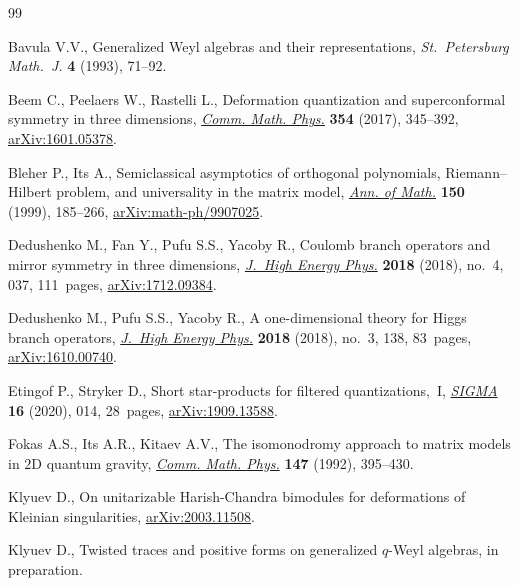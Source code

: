 \documentclass[10pt,a4paper]{amsart}
\theoremstyle{definition}
\numberwithin{equation}{section}
\begin{document}

\begin{thebibliography}{99}
\footnotesize\itemsep=0pt

Bavula V.V., Generalized {W}eyl algebras and their representations,
 \textit{St.~Petersburg Math.~J.} \textbf{4} (1993), 71--92.

Beem C., Peelaers W., Rastelli L., Deformation quantization and superconformal
 symmetry in three dimensions, \href{https://doi.org/10.1007/s00220-017-2845-6}{\textit{Comm. Math. Phys.}} \textbf{354} (2017),
 345--392, \href{https://arxiv.org/abs/1601.05378}{arXiv:1601.05378}.

Bleher P., Its A., Semiclassical asymptotics of orthogonal polynomials,
 {R}iemann--{H}ilbert problem, and universality in the matrix model,
 \href{https://doi.org/10.2307/121101}{\textit{Ann. of Math.}} \textbf{150} (1999), 185--266,
 \href{https://arxiv.org/abs/math-ph/9907025}{arXiv:math-ph/9907025}.

Dedushenko M., Fan Y., Pufu S.S., Yacoby R., Coulomb branch operators and
 mirror symmetry in three dimensions, \href{https://doi.org/10.1007/jhep04(2018)037}{\textit{J.~High Energy Phys.}}
 \textbf{2018} (2018), no.~4, 037, 111~pages, \href{https://arxiv.org/abs/1712.09384}{arXiv:1712.09384}.

Dedushenko M., Pufu S.S., Yacoby R., A one-dimensional theory for {H}iggs
 branch operators, \href{https://doi.org/10.1007/jhep03(2018)138}{\textit{J.~High Energy Phys.}} \textbf{2018} (2018), no.~3,
 138, 83~pages, \href{https://arxiv.org/abs/1610.00740}{arXiv:1610.00740}.

Etingof P., Stryker D., Short star-products for filtered quantizations,~{I},
 \href{https://doi.org/10.3842/SIGMA.2020.014}{\textit{SIGMA}} \textbf{16} (2020), 014, 28~pages, \href{https://arxiv.org/abs/1909.13588}{arXiv:1909.13588}.

Fokas A.S., Its A.R., Kitaev A.V., The isomonodromy approach to matrix models
 in {$2$}{D} quantum gravity, \href{https://doi.org/10.1007/BF02096594}{\textit{Comm. Math. Phys.}} \textbf{147} (1992),
 395--430.

Klyuev D., On unitarizable Harish-Chandra bimodules for deformations of
 {K}leinian singularities, \href{https://arxiv.org/abs/2003.11508}{arXiv:2003.11508}.

Klyuev D., Twisted traces and positive forms on generalized $q$-{W}eyl
 algebras, {i}n preparation.


\end{thebibliography}
\end{document}
